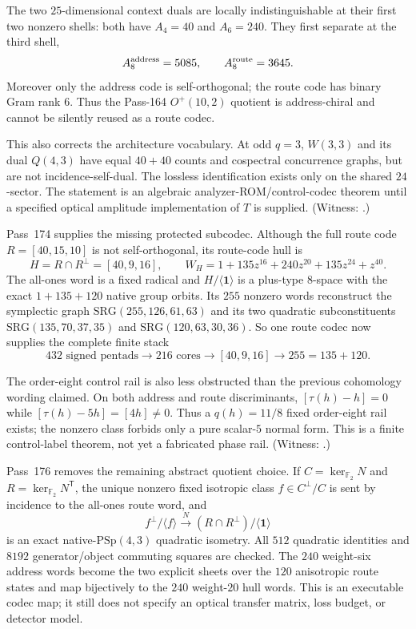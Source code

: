 \documentclass[11pt]{article}
\newcommand{\PSp}{\mathrm{PSp}}
\newcommand{\SRG}{\mathrm{SRG}}
\begin{document}
The two $25$-dimensional context duals are locally indistinguishable at
their first two nonzero shells: both have $A_4=40$ and $A_6=240$.  They
first separate at the third shell,
\[
 A_8^{\rm address}=5085,
 \qquad A_8^{\rm route}=3645.
\]
Moreover only the address code is self-orthogonal; the route code has
binary Gram rank $6$.  Thus the Pass-164 $O^+(10,2)$ quotient is
address-chiral and cannot be silently reused as a route codec.

This also corrects the architecture vocabulary.  At odd $q=3$,
$W(3,3)$ and its dual $Q(4,3)$ have equal $40+40$ counts and cospectral
concurrence graphs, but are not incidence-self-dual.  The lossless
identification exists only on the shared $24$-sector.  The statement is
an algebraic analyzer-ROM/control-codec theorem until a specified optical
amplitude implementation of $T$ is supplied.  (Witness:
.)

Pass~174 supplies the missing protected subcodec.  Although the full
route code $R=[40,15,10]$ is not self-orthogonal, its route-code hull is
\[
 H=R\cap R^\perp=[40,9,16],
 \qquad
 W_H=1+135z^{16}+240z^{20}+135z^{24}+z^{40}.
\]
The all-ones word is a fixed radical and
$H/\langle\mathbf1\rangle$ is a plus-type $8$-space with the exact
$1+135+120$ native group orbits.  Its $255$ nonzero words reconstruct
the symplectic graph $\SRG(255,126,61,63)$ and its two quadratic
subconstituents $\SRG(135,70,37,35)$ and
$\SRG(120,63,30,36)$.  So one route codec now supplies the complete
finite stack
\[
 432\text{ signed pentads}\to216\text{ cores}\to[40,9,16]
 \to255=135+120.
\]

The order-eight control rail is also less obstructed than the previous
cohomology wording claimed.  On both address and route discriminants,
$[\tau(h)-h]=0$ while
$[\tau(h)-5h]=[4h]\ne0$.  Thus a $q(h)=11/8$ fixed order-eight rail
exists; the nonzero class forbids only a pure scalar-$5$ normal form.
This is a finite control-label theorem, not yet a fabricated phase rail.
(Witness: .)

Pass~176 removes the remaining abstract quotient choice.  If
$C=\ker_{\mathbb F_2}N$ and $R=\ker_{\mathbb F_2}N^{\mathsf T}$, the
unique nonzero fixed isotropic class $f\in C^\perp/C$ is sent by incidence
to the all-ones route word, and
\[
 f^\perp/\langle f\rangle
 \xrightarrow{\;N\;}
 (R\cap R^\perp)/\langle\mathbf1\rangle
\]
is an exact native-$\PSp(4,3)$ quadratic isometry.  All $512$ quadratic
identities and $8192$ generator/object commuting squares are checked.
The $240$ weight-six address words become the two explicit sheets over
the $120$ anisotropic route states and map bijectively to the $240$
weight-$20$ hull words.  This is an executable codec map; it still does
not specify an optical transfer matrix, loss budget, or detector model.
\end{document}
